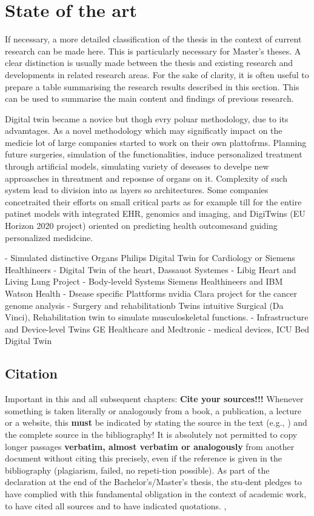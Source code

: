 \documentclass[12pt]{report}           %
\theoremstyle{thesis}        %
\begin{document}
	\chapter{State of the art}\label{chap:StandDerTechnik}
	If necessary, a more detailed classification of the thesis in the context of current research can be made here. This is particularly necessary for Master's theses. A clear distinction is usually made between the thesis and existing research and developments in related research areas. For the sake of clarity, it is often useful to prepare a table summarising the research results described in this section. This can be used to summarise the main content and findings of previous research.
	
	
	
	
	Digital twin became a novice but thogh evry poluar methodology, due to its advamtages.  As a novel methodology which may significatly impact  on the medicie lot of large companies started to work on their own plattofrms. Planning future surgeries, simulation of the functionalities, induce  personalized treatment through artificial models, simulating variety of deseases to develpe new approasches in threatment and reposnse of organs on it.  Complexity of such system lead to division into as layers so architectures. Some companies concetraited their efforts on small critical parts as for example  till  for the entire patinet models with integrated EHR, genomics and imaging, and DigiTwins (EU Horizon 2020 project) oriented on predicting health outcomesand guiding personalized medidcine.
	
	- Simulated distinctive Organs
		Philips Digital Twin for Cardiology or Siemens Healthineers - Digital Twin of the heart, Dassauot Systemes - Libig Heart and Living Lung Project
	- Body-leveld Systems
	Siemens Healthineers and IBM Watson Health
	- Dsease specific Plattforms
	nvidia Clara project for the cancer genome analysis
	- Surgery and rehabilitationb Twins
	intuitive Surgical (Da Vinci), Rehabilitation twin to simulate musculoskeletal functions.
	- Infrastructure and Device-level Twins
	GE Healthcare and Medtronic - medical devices, ICU Bed Digital Twin
	
	
	\section{Citation}
	Important in this and all subsequent chapters: {\bf Cite your sources!!!} Whenever something is taken literally or analogously from a book, a publication, a lecture or a website, this {\bf must} be indicated by stating the source in the text (e.g., \cite[vgl.][S.\ 23ff]{Lenze_Einfuehrung_2000}) and the complete source in the bibliography! It is absolutely not permitted to copy longer passages {\bf verbatim, almost verbatim or analogously} from another document without citing this precisely, even if the reference is given in the bibliography (plagiarism, failed, no repeti-tion possible). As part of the declaration at the end of the Bachelor's/Master's thesis, the stu-dent pledges to have complied with this fundamental obligation in the context of academic work, to have cited all sources and to have indicated quotations.  \cite{Bloch2023PreprintResolver}, \cite{Bloch2023PreprintResolvera}
	
\end{document}
